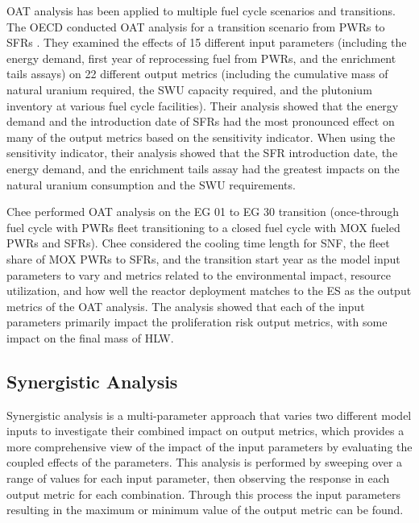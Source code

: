 \gls{OAT} analysis has been applied to multiple fuel cycle scenarios and 
transitions. The \gls{OECD} conducted \gls{OAT} analysis for a transition scenario 
from \glspl{PWR} to \glspl{SFR} \cite{noauthor_effects_2017}. They examined 
the effects of 15 different 
input parameters (including the energy demand, first year of reprocessing fuel 
from \glspl{PWR}, and the enrichment tails assays) on 22 different output metrics 
(including the cumulative mass of natural uranium required, the \gls{SWU} capacity 
required, and the plutonium inventory at various fuel cycle facilities). 
Their analysis showed that the energy demand and the introduction date of 
\glspl{SFR} had the most pronounced effect on many of the output metrics 
based on the 
sensitivity indicator. When using the sensitivity indicator, their analysis 
showed that the \gls{SFR} introduction date, the energy demand, and the 
enrichment tails assay had the greatest impacts on the natural uranium 
consumption and the \gls{SWU} requirements. 

Chee \cite{chee_sensitivity_2019} performed \gls{OAT} analysis on the \gls{EG} 
01 to \gls{EG} 30 transition 
(once-through fuel cycle with \glspl{PWR} fleet transitioning to a 
closed fuel cycle with \gls{MOX} fueled \glspl{PWR} and \glspl{SFR}). 
Chee considered the cooling time length 
for \gls{SNF}, the fleet share of \gls{MOX} \glspl{PWR} to \glspl{SFR}, and 
the transition start year as the model input parameters to vary and metrics 
related to the environmental impact, resource utilization, and how well 
the reactor deployment matches to the \gls{ES} \cite{wigeland_nuclear_2014} 
as the output 
metrics of the \gls{OAT} analysis. The analysis showed 
that each of the input parameters primarily impact the proliferation risk 
output metrics, with some impact on the final mass of \gls{HLW}. 

\subsection{Synergistic Analysis}\label{sec:synergistic_background}
Synergistic analysis is a multi-parameter approach that varies two different 
model inputs to investigate their combined impact on output metrics, 
which provides a more comprehensive view of the impact of the input 
parameters by evaluating the coupled effects of the parameters.
This analysis is performed by sweeping over a range of values for each input 
parameter, then observing the response in each output metric for each 
combination. Through this process the input parameters resulting in the 
maximum or minimum value of the output metric can be found. 

